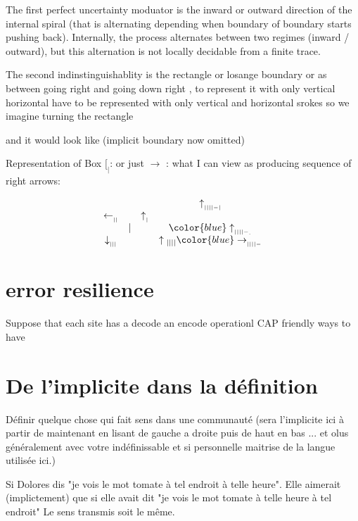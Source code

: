 \documentclass{article}
\newcommand{\blue}[1]{{\color{blue} #1}}
\begin{document}
The first perfect  uncertainty moduator is the inward or outward  direction of the internal spiral (that is alternating depending when boundary of boundary starts pushing back). Internally, the process alternates between two regimes (inward / outward), but this alternation is not locally decidable from a finite trace.



The second indinstinguishablity is the rectangle or losange boundary or as between  going  right and going down right , to represent it   with  only  vertical horizontal   have to be represented with only vertical and horizontal srokes so we imagine turning the rectangle 

and it would look like (implicit boundary now omitted)

Representation of  Box $[_|$: or just $\rightarrow$ : what I can view as producing sequence of right arrows:

$$
\begin{matrix}
                         & &                        &\uparrow_{_{||||-|}}\\
\leftarrow_{_{||}}& &\uparrow_{_|}\\
                          &|&&                   \blue{\uparrow_{_{||||-_.}}} \\
\downarrow_{_{|||}}&&&                \uparrow{_{||||}}\blue{\rightarrow_{_{||||-}}}\\ 
\end{matrix}
$$
 
 
 \section{error resilience}
 Suppose that each site has a decode an encode operationl CAP friendly ways  to have  

\section{De l'implicite dans la définition}
Définir quelque chose qui fait sens dans une communauté (sera l'implicite ici à partir de maintenant en lisant de gauche a droite puis de haut en bas ... et olus généralement avec votre indéfinissable et si personnelle maitrise de la langue utilisée ici.)

Si Dolores dis "je vois le mot tomate à tel endroit à telle heure". Elle aimerait (implictement) que si elle avait dit "je vois le mot tomate à telle heure à tel endroit" Le sens transmis soit le même. 
\end{document}
